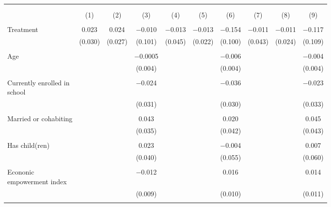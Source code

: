 \documentclass{report}
\begin{document}
\pagestyle{empty}

\begin{table}[!htbp] \centering 
  \caption{} 
  \label{} 
\begin{tabular}{@{\extracolsep{5pt}}lccccccccc} 
\\[-1.8ex]\hline 
\hline \\[-1.8ex] 
\\[-1.8ex] & (1) & (2) & (3) & (4) & (5) & (6) & (7) & (8) & (9)\\ 
\hline \\[-1.8ex] 
 Treatment & 0.023 & 0.024 & $-$0.010 & $-$0.013 & $-$0.013 & $-$0.154 & $-$0.011 & $-$0.011 & $-$0.117 \\ 
  & (0.030) & (0.027) & (0.101) & (0.045) & (0.022) & (0.100) & (0.043) & (0.024) & (0.109) \\ 
  & & & & & & & & & \\ 
 Age &  &  & $-$0.0005 &  &  & $-$0.006 &  &  & $-$0.004 \\ 
  &  &  & (0.004) &  &  & (0.004) &  &  & (0.004) \\ 
  & & & & & & & & & \\ 
 \makecell[l]{Currently enrolled in\\\hspace{1em}school} &  &  & $-$0.024 &  &  & $-$0.036 &  &  & $-$0.023 \\ 
  &  &  & (0.031) &  &  & (0.030) &  &  & (0.033) \\ 
  & & & & & & & & & \\ 
 Married or cohabiting &  &  & 0.043 &  &  & 0.020 &  &  & 0.045 \\ 
  &  &  & (0.035) &  &  & (0.042) &  &  & (0.043) \\ 
  & & & & & & & & & \\ 
 Has child(ren) &  &  & 0.023 &  &  & $-$0.004 &  &  & 0.007 \\ 
  &  &  & (0.040) &  &  & (0.055) &  &  & (0.060) \\ 
  & & & & & & & & & \\ 
 \makecell[l]{Econonic\\\hspace{1em}empowerment index} &  &  & $-$0.012 &  &  & 0.016 &  &  & 0.014 \\ 
  &  &  & (0.009) &  &  & (0.010) &  &  & (0.011) \\ 
  & & & & & & & & & \\ 

\end{tabular}
\end{table}
\end{document}
